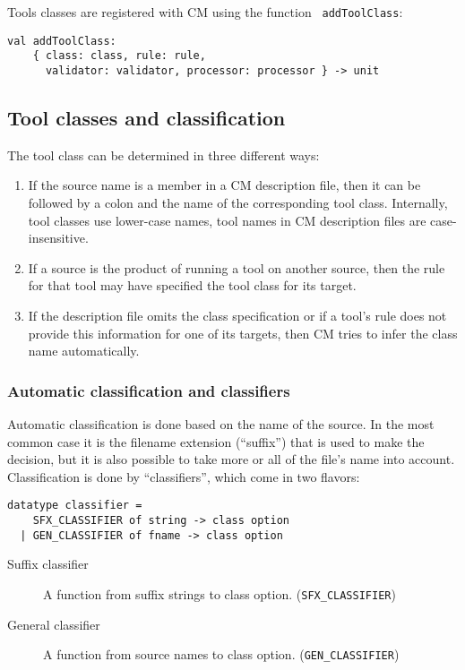 \documentclass{article}
\begin{document}
Tools classes are registered with CM using the function {\tt
addToolClass}:
\begin{verbatim}
val addToolClass:
    { class: class, rule: rule,
      validator: validator, processor: processor } -> unit
\end{verbatim}

\subsection{Tool classes and classification}

The tool class can be determined in three different ways:

\begin{enumerate}
\item If the source name is a member in a CM description file, then it
can be followed by a colon and the name of the corresponding tool
class.  Internally, tool classes use lower-case names, tool names in
CM description files are case-insensitive.
\item If a source is the product of running a tool on another source,
then the rule for that tool may have specified the tool class for its
target.
\item If the description file omits the class specification or if a
tool's rule does not provide this information for one of its targets,
then CM tries to infer the class name automatically.
\end{enumerate}

\subsubsection*{Automatic classification and classifiers}

Automatic classification is done based on the name of the source.  In
the most common case it is the filename extension (``suffix'') that is
used to make the decision, but it is also possible to take more or all
of the file's name into account.  Classification is done by
``classifiers'', which come in two flavors:

\begin{verbatim}
datatype classifier =
    SFX_CLASSIFIER of string -> class option
  | GEN_CLASSIFIER of fname -> class option
\end{verbatim}

\begin{description}
\item[Suffix classifier] A function from suffix strings to class
option. (\verb+SFX_CLASSIFIER+)
\item[General classifier] A function from source names
to class option. (\verb+GEN_CLASSIFIER+)
\end{description}
\end{document}
